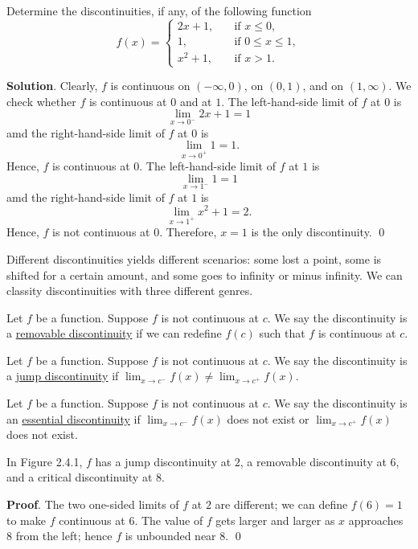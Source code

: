 \documentclass[11pt]{book}
\begin{document}
\begin{example}
    Determine the discontinuities, if any, of the following function $$f(x)=\left\{\begin{array}{ll}
        2x+1,\quad & \text{if $x\leq 0$},\\
        1, \quad & \text{if $0\leq x\leq 1$},\\
        x^2+1, \quad & \text{if $x>1$}.
    \end{array}\right.$$
\end{example}
\textbf{Solution}. Clearly, $f$ is continuous on $(-\infty, 0)$, on $(0, 1)$, and on $(1, \infty)$. We check whether $f$ is continuous at $0$ and at $1$. The left-hand-side limit of $f$ at $0$ is $$\lim_{x\to 0^-}2x+1=1$$ amd the right-hand-side limit of $f$ at $0$ is $$\lim_{x\to 0^+}1=1.$$ Hence, $f$ is continuous at $0$. The left-hand-side limit of $f$ at $1$ is $$\lim_{x\to 1^-}1=1$$ amd the right-hand-side limit of $f$ at $1$ is $$\lim_{x\to 1^+}x^2+1=2.$$ Hence, $f$ is not continuous at $0$. Therefore, $x=1$ is the only discontinuity. \qed

Different discontinuities yields different scenarios: some lost a point, some is shifted for a certain amount, and some goes to infinity or minus infinity. We can classity discontinuities with three different genres.

\begin{definition}
    Let $f$ be a function. Suppose $f$ is not continuous at $c$. We say the discontinuity is a \underline{removable discontinuity} if we can redefine $f(c)$ such that $f$ is continuous at $c$.
\end{definition}

\begin{definition}
    Let $f$ be a function. Suppose $f$ is not continuous at $c$. We say the discontinuity is a \underline{jump discontinuity} if $\displaystyle\lim_{x\to c^-}f(x)\ne\lim_{x\to c^+}f(x)$.
\end{definition}

\begin{definition}
    Let $f$ be a function. Suppose $f$ is not continuous at $c$. We say the discontinuity is an \underline{essential discontinuity} if $\displaystyle\lim_{x\to c^-}f(x)$ does not exist or $\displaystyle\lim_{x\to c^+}f(x)$ does not exist.
\end{definition}

\begin{example}
    In Figure 2.4.1, $f$ has a jump discontinuity at $2$, a removable discontinuity at $6$, and a critical discontinuity at $8$.
\end{example}
\textbf{Proof}. The two one-sided limits of $f$ at $2$ are different; we can define $f(6)=1$ to make $f$ continuous at $6$. The value of $f$ gets larger and larger as $x$ approaches $8$ from the left; hence $f$ is unbounded near $8$. \qed 
\end{document}
